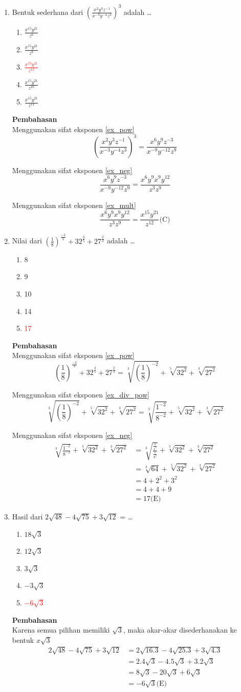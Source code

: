 \documentclass{report}
\newcommand{\options}[5]{
\begin{enumerate}[label=\alph*.]
	\item #1
	\item #2
	\item #3
	\item #4
	\item #5
\end{enumerate}
}
\newcommand{\pemb}{ \textbf{Pembahasan} \\}
\begin{document}
\begin{enumerate}
\item
Bentuk sederhana dari $\left(\frac{x^{2}y^{3}z^{-1}}{x^{-3}y^{-4}z^{3}}\right)^3$ adalah \ldots
\options
{$\frac{x^{15} y^{21}}{z^6}$}
{$\frac{x^{15} y^{21}}{z^8}$}
{\textcolor{red}{{$\frac{x^{15} y^{21}}{z^{12}}$}}}
{$\frac{x^{15} y^{21}}{z^{10}}$}
{$\frac{x^{15} y^{21}}{z^{14}}$}

\pemb

Menggunakan sifat eksponen \ref{ex_pow}
\[
	\left(\frac{x^{2}y^{3}z^{-1}}{x^{-3}y^{-4}z^{3}}\right)^3 = \frac{x^{6}y^{9}z^{-3}}{x^{-9}y^{-12}z^{9}}
\]

Menggunakan sifat eksponen \ref{ex_neg}
\[
	\frac{x^{6}y^{9}z^{-3}}{x^{-9}y^{-12}z^{9}} =
	\frac{x^{6}y^{9}x^{9}y^{12}}{z^{3}z^{9}}
\]

Menggunakan sifat eksponen \ref{ex_mult}
\[
	\frac{x^{6}y^{9}x^{9}y^{12}}{z^{3}z^{9}} = 
	\frac{x^{15} y^{21}}{z^{12}} \text{(C)}
\]


\item
Nilai dari $\left(\frac{1}{8}\right)^{\frac{-2}{3}}+32^{\frac{2}{5}}+27^{\frac{2}{3}}$ adalah \ldots
\options
{8}
{9}
{10}
{14}
{\textcolor{red}{17}}

\pemb

Menggunakan sifat eksponen \ref{ex_pow}
\[
	\left(\frac{1}{8}\right)^{\frac{-2}{3}}+32^{\frac{2}{5}}+27^{\frac{2}{3}} = 
	\sqrt[3]{\left(\frac{1}{8}\right)^{-2}}+\sqrt[5]{32^{2}}+\sqrt[3]{27^{2}}
\]

Menggunakan sifat eksponen \ref{ex_div_pow}
\[
	\sqrt[3]{\left(\frac{1}{8}\right)^{-2}}+\sqrt[5]{32^{2}}+\sqrt[3]{27^{2}} =
	\sqrt[3]{\frac{1^{-2}}{8^{-2}}}+\sqrt[5]{32^{2}}+\sqrt[3]{27^{2}}	
\]

Menggunakan sifat eksponen \ref{ex_neg} \\
\begin{align*}
	\sqrt[3]{\frac{1^{-2}}{8^{-2}}}+\sqrt[5]{32^{2}}+\sqrt[3]{27^{2}} 
	&= \sqrt[3]{\frac{\frac{1}{1^{2}}}{\frac{1}{8^{2}}}}+\sqrt[5]{32^{2}}+\sqrt[3]{27^{2}}\\
	&= \sqrt[3]{64}+\sqrt[5]{32^{2}}+\sqrt[3]{27^{2}}\\
	&= 4 + 2^2 + 3^2 \\
	&= 4 + 4 + 9 \\
	&= 17  \text{(E)}
\end{align*}

\item
Hasil dari $2\sqrt{48}-4\sqrt{75}+3\sqrt{12}$ = \ldots
\options
{$18\sqrt{3}$}
{$12\sqrt{3}$}
{$3\sqrt{3}$}
{$-3\sqrt{3}$}
{\textcolor{red}{$-6\sqrt{3}$}}
\pemb
Karena semua pilihan memiliki $\sqrt{3}$, maka akar-akar disederhanakan ke bentuk $x\sqrt{3}$
\begin{align*}
	2\sqrt{48}-4\sqrt{75}+3\sqrt{12} 
	&= 2\sqrt{16.3}-4\sqrt{25.3}+3\sqrt{4.3} \\
	&= 2.4\sqrt{3}-4.5\sqrt{3}+3.2\sqrt{3} \\
	&= 8\sqrt{3}-20\sqrt{3}+6\sqrt{3} \\
	&= -6\sqrt{3} \text{(E)}
\end{align*}


\end{enumerate}
\end{document}
